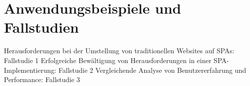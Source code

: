 \section{Anwendungsbeispiele und Fallstudien}
Herausforderungen bei der Umstellung von traditionellen Websites auf SPAs: Fallstudie 1
Erfolgreiche Bewältigung von Herausforderungen in einer SPA-Implementierung: Fallstudie 2
Vergleichende Analyse von Benutzererfahrung und Performance: Fallstudie 3